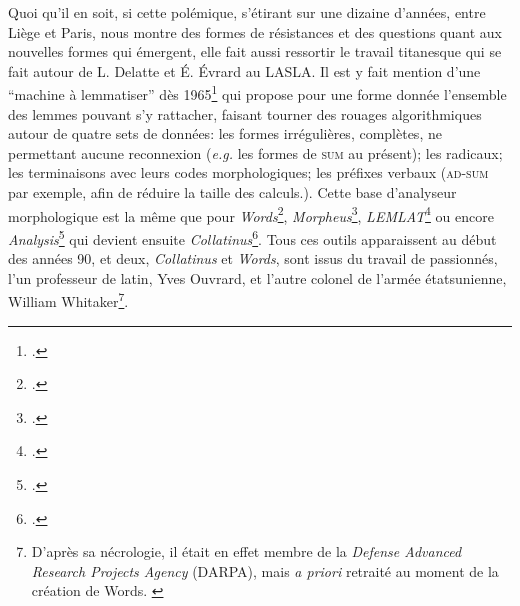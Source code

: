 Quoi qu'il en soit, si cette polémique, s'étirant sur une dizaine d'années, entre Liège et Paris, nous montre des formes de résistances et des questions quant aux nouvelles formes qui émergent, elle fait aussi ressortir le travail titanesque qui se fait autour de L. Delatte et É. Évrard au LASLA. Il est y fait mention d'une \enquote{machine à lemmatiser} dès 1965\footcite{delatte_programme_1965} qui propose pour une forme donnée l'ensemble des lemmes pouvant s'y rattacher, faisant tourner des rouages algorithmiques autour de quatre sets de données: les formes irrégulières, complètes, ne permettant aucune reconnexion (\textit{e.g.} les formes de \textsc{sum} au présent); les radicaux; les terminaisons avec leurs codes morphologiques; les préfixes verbaux (\textsc{ad-sum} par exemple, afin de réduire la taille des calculs.). Cette base d'analyseur morphologique est la même que pour \textit{Words}\footcite{whitaker_words_1993}, \textit{Morpheus}\footcite{crane_generating_1991}, \textit{LEMLAT}\footcite{bozzi_lemlat_1992} ou encore \textit{Analysis}\footcite{ouvrard_analysis_1992} qui devient ensuite \textit{Collatinus}\footcite{ouvrard_collatinus_1999}. Tous ces outils apparaissent au début des années 90, et deux, \textit{Collatinus} et \textit{Words}, sont issus du travail de passionnés, l'un professeur de latin, Yves Ouvrard, et l'autre colonel de l'armée étatsunienne, William Whitaker\footnote{D'après sa nécrologie, il était en effet membre de la \textit{Defense Advanced Research Projects Agency} (DARPA), mais \textit{a priori} retraité au moment de la création de Words. \textcite{noauthor_william_nodate}}.

